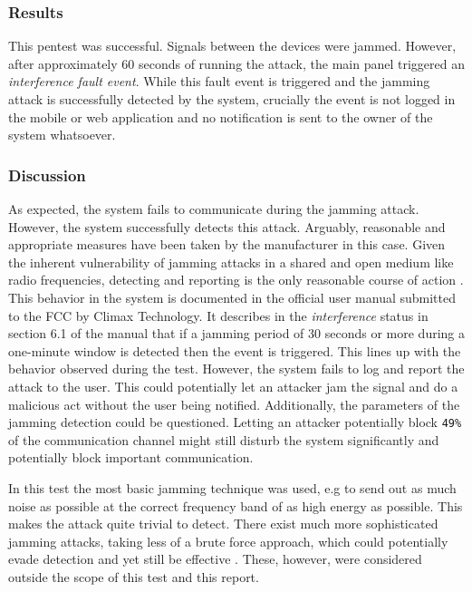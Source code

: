 \subsubsection{Results}
This pentest was successful. Signals between the devices were jammed. However, after approximately 60 seconds of running the attack, the main panel triggered an \textit{interference fault event}. While this fault event is triggered and the jamming attack is successfully detected by the system, crucially the event is not logged in the mobile or web application and no notification is sent to the owner of the system whatsoever.

\subsubsection{Discussion}
As expected, the system fails to communicate during the jamming attack. However, the system successfully detects this attack. Arguably, reasonable and appropriate measures have been taken by the manufacturer in this case. Given the inherent vulnerability of jamming attacks in a shared and open medium like radio frequencies, detecting and reporting is the only reasonable course of action 
\cite{optimal-jamming-defense}. This behavior in the system is documented in the official user manual submitted to the FCC \cite{hsgw-user-manual} by Climax Technology. It describes in the \textit{interference} status in section 6.1 of the manual that if a jamming period of 30 seconds or more during a one-minute window is detected then the event is triggered. This lines up with the behavior observed during the test. However, the system fails to log and report the attack to the user. This could potentially let an attacker jam the signal and do a malicious act without the user being notified. Additionally, the parameters of the jamming detection could be questioned. Letting an attacker potentially block \texttt{49\%} of the communication channel might still disturb the system significantly and potentially block important communication.

In this test the most basic jamming technique was used, e.g to send out as much noise as possible at the correct frequency band of as high energy as possible. This makes the attack quite trivial to detect. There exist much more sophisticated jamming attacks, taking less of a brute force approach, which could potentially evade detection and yet still be effective \cite{mpitziopoulos2009survey}. These, however, were considered outside the scope of this test and this report.
